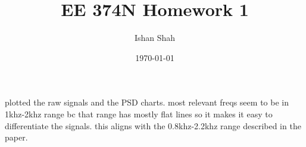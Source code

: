 \documentclass[12pt]{article}
\begin{document}
\title{EE 374N Homework 1}
\author{Ishan Shah}
\date{\today}
\maketitle

plotted the raw signals and the PSD charts. most relevant freqs seem to be in 1khz-2khz range bc that range has mostly flat lines so it makes it easy to differentiate the signals. this aligns with the 0.8khz-2.2khz range described in the paper.
\end{document}
